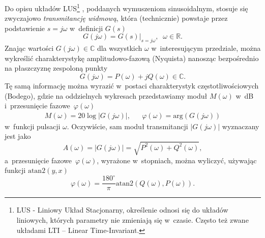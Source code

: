 \documentclass[paper=a4,DIV=12]{lpas}
\newcommand{\degree}{^{\circ}}
\begin{document}
\begin{appendices}
  Do opisu układów LUS\footnote{LUS - Liniowy Układ Stacjonarny, określenie
  odnosi się do układów liniowych, których parametry nie zmieniają się
  w~czasie. Często też zwane układami LTI -- Linear Time-Invariant.} ,
  poddanych wymuszeniom sinusoidalnym, stosuje się zwyczajowo {\em transmitancję
  widmową}, która (technicznie) powstaje przez podstawienie $s = j\omega$
  w~definicji $G(s)$
  \begin{equation}
    G\left(j \omega\right) = G\left(s\right)|_{s = j \omega},
    \;\; \omega \in \mathbb{R}.
    \label{eq:WEMIV}
  \end{equation}
  Znając wartości $G(j\omega) \in \mathbb{C}$ dla wszystkich $\omega$
  w~interesującym przedziale, można wykreślić charakterystykę amplitudowo-fazową
  (Nyquista) nanosząc bezpośrednio na płaszczyznę zespoloną punkty
  \begin{equation}
    G(j\omega) = P(\omega) +j Q(\omega) \in \mathbb{C}.
    \label{eq:Z6A8G}
  \end{equation}
  Tę samą informację można wyrazić w~postaci charakterystyk częstotliwościowych
  (Bodego), gdzie na oddzielnych wykresach przedstawiamy moduł $M(\omega)$ w~dB
  i~przesunięcie fazowe~$\varphi(\omega)$
  \begin{equation}
    \begin{aligned}
      &
      M(\omega) = 20 \log \left|G(j\omega)\right|,
      &&
      \varphi(\omega) = \text{arg}{\left(G(j\omega)\right)}
      &
    \end{aligned}
    \label{eq:YT6UA}
  \end{equation}
  w~funkcji pulsacji $\omega$. Oczywiście, sam moduł transmitancji $|G(j\omega)|$
  wyznaczany jest jako
  \begin{equation}
    A(\omega) = |G(j\omega)| = \sqrt{P^2(\omega) + Q^2(\omega)},
    \label{eq:S278F}
  \end{equation}
  a~przesunięcie fazowe~$\varphi(\omega)$, wyrażone w~stopniach, można
  wyliczyć, używając funkcji
  $\text{atan2}(y,x)$
  \begin{equation}
    \varphi(\omega) = \frac{180\degree}{\pi}\text{atan2}(Q(\omega), P(\omega)).
    \label{eq:XDQ8Q}
  \end{equation}


\end{appendices}
\end{document}
